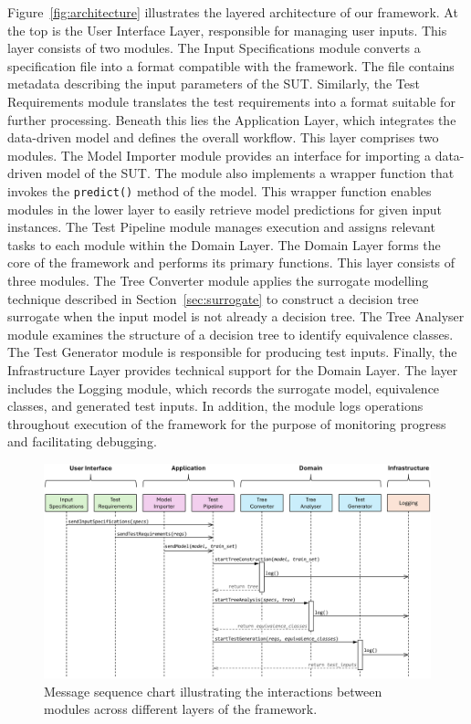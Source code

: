 \documentclass[
]{ceurart}
\theoremstyle{definition}
\begin{document}
Figure~\ref{fig:architecture} illustrates the layered architecture of our framework. At the top is the User Interface Layer, responsible for managing user inputs. This layer consists of two modules. The Input Specifications module converts a specification file into a format compatible with the framework. The file contains metadata describing the input parameters of the SUT. Similarly, the Test Requirements module translates the test requirements into a format suitable for further processing. Beneath this lies the Application Layer, which integrates the data-driven model and defines the overall workflow. This layer comprises two modules. The Model Importer module provides an interface for importing a data-driven model of the SUT. The module also implements a wrapper function that invokes the \lstinline{predict()} method of the model. This wrapper function enables modules in the lower layer to easily retrieve model predictions for given input instances. The Test Pipeline module manages execution and assigns relevant tasks to each module within the Domain Layer. The Domain Layer forms the core of the framework and performs its primary functions. This layer consists of three modules. The Tree Converter module applies the surrogate modelling technique described in Section~\ref{sec:surrogate} to construct a decision tree surrogate when the input model is not already a decision tree. The Tree Analyser module examines the structure of a decision tree to identify equivalence classes. The Test Generator module is responsible for producing test inputs. Finally, the Infrastructure Layer provides technical support for the Domain Layer. The layer includes the Logging module, which records the surrogate model, equivalence classes, and generated test inputs. In addition, the module logs operations throughout execution of the framework for the purpose of monitoring progress and facilitating debugging.

\begin{figure}
\centering
\includegraphics[width=\linewidth]{img/msc}
\caption{Message sequence chart illustrating the interactions between modules across different layers of the framework.}
\label{fig:msc}
\end{figure}
\end{document}
